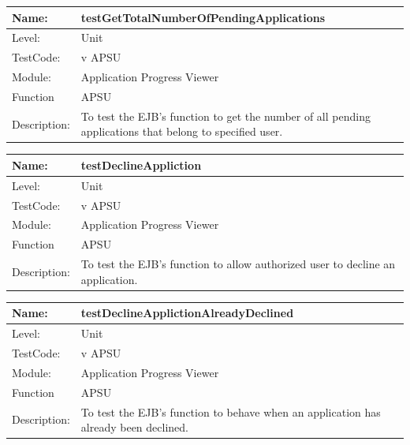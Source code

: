 \documentclass[12pt]{article}
\begin{document}
\begin{center}
\begin{tabular}{|l|p{12cm}|}
\hline

 Name: & testGetTotalNumberOfPendingApplications  \\
\hline
Level: & Unit \\
\hline
TestCode: & v APSU \\
\hline
Module:& Application Progress Viewer \\
\hline
Function & APSU \\
\hline
Description: & To test the EJB's function to get the number of all pending applications that belong to specified user. \\
\hline
\end{tabular}
\end{center}

\begin{center}
\begin{tabular}{|l|p{12cm}|}
\hline

 Name: & testDeclineAppliction  \\
\hline
Level: & Unit \\
\hline
TestCode: & v APSU \\
\hline
Module:& Application Progress Viewer \\
\hline
Function & APSU \\
\hline
Description: & To test the EJB's function to allow authorized user to decline an application. \\
\hline
\end{tabular}
\end{center}

\begin{center}
\begin{tabular}{|l|p{12cm}|}
\hline

 Name: & testDeclineApplictionAlreadyDeclined  \\
\hline
Level: & Unit \\
\hline
TestCode: & v APSU \\
\hline
Module:& Application Progress Viewer \\
\hline
Function & APSU \\
\hline
Description: & To test the EJB's function to behave when an application has already been declined. \\
\hline
\end{tabular}
\end{center}
\end{document}
